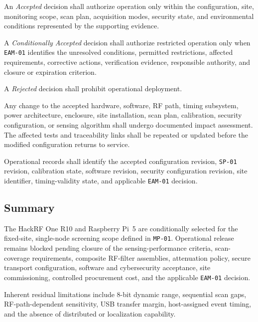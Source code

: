 \documentclass[11pt,a4paper]{article}
\begin{document}
	An \emph{Accepted} decision shall authorize operation only within the
	configuration, site, monitoring scope, scan plan, acquisition modes, security
	state, and environmental conditions represented by the supporting evidence.
	
	A \emph{Conditionally Accepted} decision shall authorize restricted operation
	only when \texttt{EAM-01} identifies the unresolved conditions, permitted
	restrictions, affected requirements, corrective actions, verification
	evidence, responsible authority, and closure or expiration criterion.
	
	A \emph{Rejected} decision shall prohibit operational deployment.
	
	Any change to the accepted hardware, software, RF path, timing subsystem,
	power architecture, enclosure, site installation, scan plan, calibration,
	security configuration, or sensing algorithm shall undergo documented impact
	assessment. The affected tests and traceability links shall be repeated or
	updated before the modified configuration returns to service.
	
	Operational records shall identify the accepted configuration revision,
	\texttt{SP-01} revision, calibration state, software revision, security
	configuration revision, site identifier, timing-validity state, and applicable
	\texttt{EAM-01} decision.
	
	\subsection*{Summary}
	
	The HackRF One R10 and Raspberry Pi~5 are conditionally selected for the
	fixed-site, single-node screening scope defined in \texttt{MP-01}. Operational
	release remains blocked pending closure of the sensing-performance criteria,
	scan-coverage requirements, composite RF-filter assemblies, attenuation
	policy, secure transport configuration, software and cybersecurity
	acceptance, site commissioning, controlled procurement cost, and the
	applicable \texttt{EAM-01} decision.
	
	Inherent residual limitations include 8-bit dynamic range, sequential scan
	gaps, RF-path-dependent sensitivity, USB transfer margin, host-assigned event
	timing, and the absence of distributed or localization capability.
	
	\newpage
	\appendix
	
\end{document}
